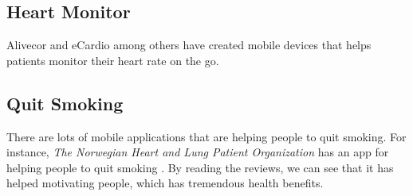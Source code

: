 \subsection{Heart Monitor}
Alivecor  and eCardio  among others have created mobile devices that helps patients monitor their heart rate on the go. 

\subsection{Quit Smoking}
There are lots of mobile applications that are helping people to quit smoking. For instance, \emph{The Norwegian Heart and Lung Patient Organization} has an app for helping people to quit smoking . By reading the reviews, we can see that it has helped motivating people, which has tremendous health benefits. 

